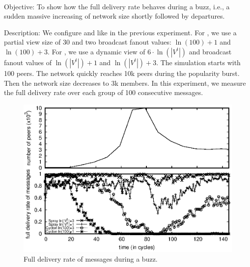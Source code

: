 \ \\

\begin{asparadesc}
\item [Objective:] To show how the full delivery rate behaves during a buzz,
  i.e., a sudden massive increasing of network size shortly followed by
  departures.
\item [Description:] We configure \SPRAY and \CYCLON like in the
  previous experiment. For \CYCLON, we use a partial view size of 30
  and two broadcast fanout values: $\ln(100)+1$ and $\ln(100)+3$. For
  \SPRAY, we use a dynamic view of $6 \cdot \ln(|V^t|)$ and broadcast
  fanout values of $\ln(|V^t|)+1$ and $\ln(|V^t|)+3$. The simulation
  starts with 100 peers. The network quickly reaches 10k peers during
  the popularity burst. Then the network size decreases to 3k
  members. In this experiment, we measure the full delivery rate over
  each group of 100 consecutive messages.

\begin{figure}
  \begin{center}
    \includegraphics[width=\SCALE\textwidth]{img/peak.eps}
    \caption{\label{fig:peak}Full delivery rate of messages during a buzz.}
  \end{center}
\end{figure}


\end{asparadesc}
